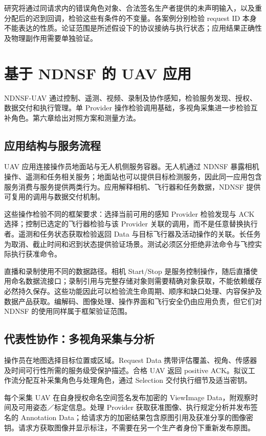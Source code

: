 研究将通过同请求内的错误角色对象、合法签名生产者提供的未声明输入，以及重分配后的迟到回调，检验这些有条件的不变量。各案例分别检验 request ID 本身不能表达的性质。论证范围是所述假设下的协议接纳与执行状态；应用结果正确性及物理副作用需要单独验证。

\chapter{基于 NDNSF 的 UAV 应用}
\label{chap:uav-ch}
\label{chap:applications-ch}
NDNSF-UAV 通过控制、遥测、视频、录制及协作感知，检验服务发现、授权、数据交付和执行管理。单 Provider 操作检验调用基础，多视角采集进一步检验互补角色。第六章给出对照方案和测量方法。

\section{应用结构与服务流程}
UAV 应用连接操作员地面站与无人机侧服务容器。无人机通过 NDNSF 暴露相机操作、遥测和任务相关服务；地面站也可以提供目标检测服务，因此同一应用包含服务消费与服务提供两类行为。应用解释相机、飞行器和任务数据，NDNSF 提供可复用的调用与数据交付机制。

这些操作检验不同的框架要求：选择当前可用的感知 Provider 检验发现与 ACK 选择；控制已选定的飞行器检验与该 Provider 关联的调用，而不是任意替换执行者。遥测和任务状态获取检验返回 Data 与目标飞行器及活动操作的关联。长任务为取消、截止时间和迟到状态提供验证场景。测试必须区分拒绝非法命令与飞控实际执行获准命令。

直播和录制使用不同的数据路径。相机 Start/Stop 是服务控制操作，随后直播使用命名数据流接口；录制引用与完整存储对象则需要精确对象获取，不能依赖缓存必然持久保存。这些功能因此可以检验流生命周期、顺序和缺口处理、内容保护及数据产品获取。编解码、图像处理、操作界面和飞行安全仍由应用负责，但它们对 NDNSF 的使用同样属于框架验证范围。



\section{代表性协作：多视角采集与分析}
操作员在地图选择目标位置或区域。Request Data 携带评估覆盖、视角、传感器及时间可行性所需的服务级受保护描述。合格 UAV 返回 positive ACK。拟议工作流分配互补采集角色与处理角色，通过 Selection 交付执行细节及适当密钥。

每个采集 UAV 在自身授权命名空间签名发布加密的 ViewImage Data，附观察时间及可用姿态／标定信息。处理 Provider 获取获准图像、执行规定分析并发布签名的 Annotation Data；给请求方的加密结果包含原图引用及获准分享的图像密钥。请求方获取图像并显示标注，不需要在另一个生产者身份下重新发布原图。

